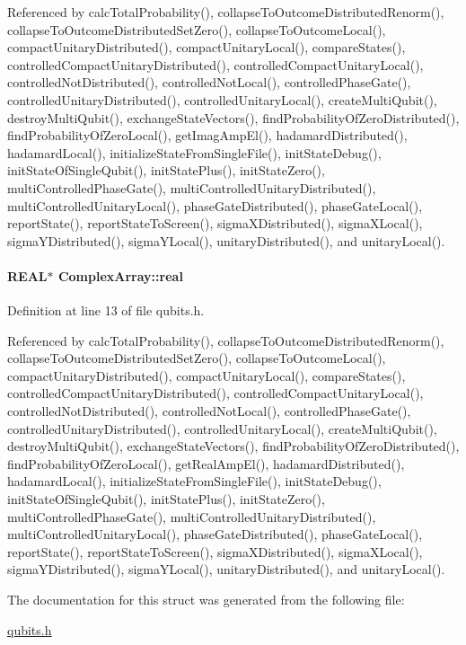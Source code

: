 Referenced by calcTotalProbability(), collapseToOutcomeDistributedRenorm(), collapseToOutcomeDistributedSetZero(), collapseToOutcomeLocal(), compactUnitaryDistributed(), compactUnitaryLocal(), compareStates(), controlledCompactUnitaryDistributed(), controlledCompactUnitaryLocal(), controlledNotDistributed(), controlledNotLocal(), controlledPhaseGate(), controlledUnitaryDistributed(), controlledUnitaryLocal(), createMultiQubit(), destroyMultiQubit(), exchangeStateVectors(), findProbabilityOfZeroDistributed(), findProbabilityOfZeroLocal(), getImagAmpEl(), hadamardDistributed(), hadamardLocal(), initializeStateFromSingleFile(), initStateDebug(), initStateOfSingleQubit(), initStatePlus(), initStateZero(), multiControlledPhaseGate(), multiControlledUnitaryDistributed(), multiControlledUnitaryLocal(), phaseGateDistributed(), phaseGateLocal(), reportState(), reportStateToScreen(), sigmaXDistributed(), sigmaXLocal(), sigmaYDistributed(), sigmaYLocal(), unitaryDistributed(), and unitaryLocal().\hypertarget{structComplexArray_a4195cac6c784ea1b6271f1c7dba1548a}{
\paragraph[{real}]{\setlength{\rightskip}{0pt plus 5cm}REAL$\ast$ {\bf ComplexArray::real}}\hfill}
\label{structComplexArray_a4195cac6c784ea1b6271f1c7dba1548a}


Definition at line 13 of file qubits.h.

Referenced by calcTotalProbability(), collapseToOutcomeDistributedRenorm(), collapseToOutcomeDistributedSetZero(), collapseToOutcomeLocal(), compactUnitaryDistributed(), compactUnitaryLocal(), compareStates(), controlledCompactUnitaryDistributed(), controlledCompactUnitaryLocal(), controlledNotDistributed(), controlledNotLocal(), controlledPhaseGate(), controlledUnitaryDistributed(), controlledUnitaryLocal(), createMultiQubit(), destroyMultiQubit(), exchangeStateVectors(), findProbabilityOfZeroDistributed(), findProbabilityOfZeroLocal(), getRealAmpEl(), hadamardDistributed(), hadamardLocal(), initializeStateFromSingleFile(), initStateDebug(), initStateOfSingleQubit(), initStatePlus(), initStateZero(), multiControlledPhaseGate(), multiControlledUnitaryDistributed(), multiControlledUnitaryLocal(), phaseGateDistributed(), phaseGateLocal(), reportState(), reportStateToScreen(), sigmaXDistributed(), sigmaXLocal(), sigmaYDistributed(), sigmaYLocal(), unitaryDistributed(), and unitaryLocal().

The documentation for this struct was generated from the following file:\begin{DoxyCompactItemize}
\item 
\hyperlink{qubits_8h}{qubits.h}\end{DoxyCompactItemize}
